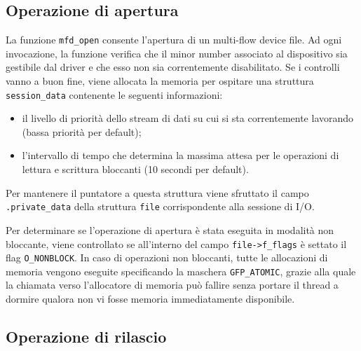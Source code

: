 \documentclass{article}
\begin{document}
\subsection{Operazione di apertura}
La funzione \texttt{mfd\_open} consente l'apertura di un multi-flow device file. Ad ogni invocazione, la funzione verifica che il minor number associato al dispositivo sia gestibile dal driver e che esso non sia correntemente disabilitato. Se i controlli vanno a buon fine, viene allocata la memoria per ospitare una struttura \texttt{session\_data} contenente le seguenti informazioni:
\begin{itemize}
\item il livello di priorità dello stream di dati su cui si sta correntemente lavorando (bassa priorità per default);
\item l'intervallo di tempo che determina la massima attesa per le operazioni di lettura e scrittura bloccanti (10 secondi per default).
\end{itemize}
Per mantenere il puntatore a questa struttura viene sfruttato il campo \texttt{.private\_data} della struttura \texttt{file} corrispondente alla sessione di I/O.

Per determinare se l'operazione di apertura è stata eseguita in modalità non bloccante, viene controllato se all'interno del campo \texttt{file->f\_flags} è settato il flag \texttt{O\_NONBLOCK}. In caso di operazioni non bloccanti, tutte le allocazioni di memoria vengono eseguite specificando la maschera \texttt{GFP\_ATOMIC}, grazie alla quale la chiamata verso l'allocatore di memoria può fallire senza portare il thread a dormire qualora non vi fosse memoria immediatamente disponibile.

\subsection{Operazione di rilascio}
\end{document}
